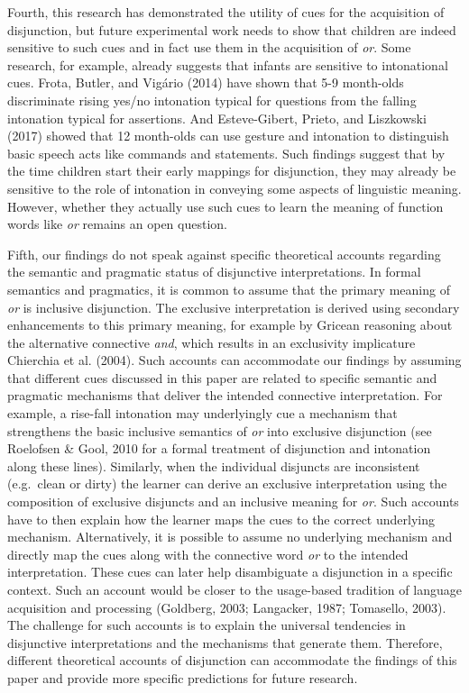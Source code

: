 \documentclass[
  ,man,floatsintext]{apa6}
\begin{document}
Fourth, this research has demonstrated the utility of cues for the acquisition of disjunction, but future experimental work needs to show that children are indeed sensitive to such cues and in fact use them in the acquisition of \emph{or}. Some research, for example, already suggests that infants are sensitive to intonational cues. Frota, Butler, and Vigário (2014) have shown that 5-9 month-olds discriminate rising yes/no intonation typical for questions from the falling intonation typical for assertions. And Esteve-Gibert, Prieto, and Liszkowski (2017) showed that 12 month-olds can use gesture and intonation to distinguish basic speech acts like commands and statements. Such findings suggest that by the time children start their early mappings for disjunction, they may already be sensitive to the role of intonation in conveying some aspects of linguistic meaning. However, whether they actually use such cues to learn the meaning of function words like \emph{or} remains an open question.

Fifth, our findings do not speak against specific theoretical accounts regarding the semantic and pragmatic status of disjunctive interpretations. In formal semantics and pragmatics, it is common to assume that the primary meaning of \emph{or} is inclusive disjunction. The exclusive interpretation is derived using secondary enhancements to this primary meaning, for example by Gricean reasoning about the alternative connective \emph{and}, which results in an exclusivity implicature Chierchia et al. (2004). Such accounts can accommodate our findings by assuming that different cues discussed in this paper are related to specific semantic and pragmatic mechanisms that deliver the intended connective interpretation. For example, a rise-fall intonation may underlyingly cue a mechanism that strengthens the basic inclusive semantics of \emph{or} into exclusive disjunction (see Roelofsen \& Gool, 2010 for a formal treatment of disjunction and intonation along these lines). Similarly, when the individual disjuncts are inconsistent (e.g.~clean or dirty) the learner can derive an exclusive interpretation using the composition of exclusive disjuncts and an inclusive meaning for \emph{or}. Such accounts have to then explain how the learner maps the cues to the correct underlying mechanism. Alternatively, it is possible to assume no underlying mechanism and directly map the cues along with the connective word \emph{or} to the intended interpretation. These cues can later help disambiguate a disjunction in a specific context. Such an account would be closer to the usage-based tradition of language acquisition and processing (Goldberg, 2003; Langacker, 1987; Tomasello, 2003). The challenge for such accounts is to explain the universal tendencies in disjunctive interpretations and the mechanisms that generate them. Therefore, different theoretical accounts of disjunction can accommodate the findings of this paper and provide more specific predictions for future research.
\end{document}
